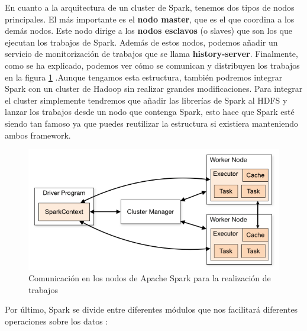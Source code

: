 En cuanto a la arquitectura de un cluster de Spark, tenemos dos tipos de nodos principales. El más importante es el \textbf{nodo master}, que es el que coordina a los demás nodos. Este nodo dirige a los \textbf{nodos esclavos} (o slaves) que son los que ejecutan los trabajos de Spark. Además de estos nodos, podemos añadir un servicio de monitorización de trabajos que se llama \textbf{history-server}. Finalmente, como se ha explicado, podemos ver cómo se comunican y distribuyen los trabajos en la figura \ref{SpkImg-1} \cite{Spk-6}.Aunque tengamos esta estructura, también podremos integrar Spark con un cluster de Hadoop sin realizar grandes modificaciones. Para integrar el cluster simplemente tendremos que añadir las librerías de Spark al HDFS y lanzar los trabajos desde un nodo que contenga Spark, esto hace que Spark esté siendo tan famoso ya que puedes reutilizar la estructura si existiera manteniendo ambos framework.\par

\begin{figure}[htp]
\centering
\includegraphics[scale=0.65]{Imagenes/spark1.png}
\caption{Comunicación en los nodos de Apache Spark para la realización de trabajos}
\label{SpkImg-1}
\end{figure}

Por último, Spark se divide entre diferentes módulos que nos facilitará diferentes operaciones sobre los datos  \cite{Spk-3}:\par

